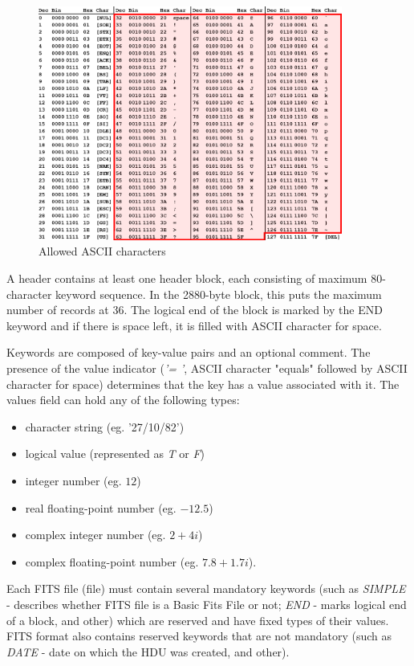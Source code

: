 	\begin{figure}[H]
	\centering
	  \includegraphics[width=10cm]{images/asciifull}
		  \caption{Allowed ASCII characters}
	  \label{fig:allowed_ascii}
	\end{figure}
	
	A header contains at least one header block, each consisting of maximum 80-character keyword sequence. In the 2880-byte block, this puts the maximum number of records at 36. The logical end of the block is marked by the END keyword and if there is space left, it is filled with ASCII character for space.
	
	Keywords are composed of key-value pairs and an optional comment. The presence of the value indicator (\emph{'= '}, ASCII character "equals" followed by ASCII character for space) determines that the key has a value associated with it. The values field can hold any of the following types:
	
	\begin{itemize}
		\item character string (eg. '27/10/82')
		\item logical value (represented as \emph{T} or \emph{F})
		\item integer number (eg. $12$)
		\item real floating-point number (eg. $-12.5$)
		\item complex integer number (eg. $2+4i$)
		\item complex floating-point number (eg. $7.8+1.7i$).
	\end{itemize}
	
	 Each FITS file (file) must contain several mandatory keywords (such as \emph{SIMPLE} - describes whether FITS file is a Basic Fits File or not; \emph{END} - marks logical end of a block, and other) which are reserved and have fixed types of their values. FITS format also contains reserved keywords that are not mandatory (such as \emph{DATE} - date on which the HDU was created, and other).
	 
